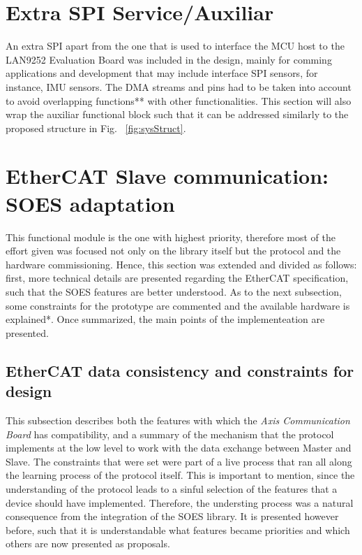 \section{Extra SPI Service/Auxiliar}\label{sec:spi}

An extra SPI apart from the one that is used to interface the MCU host to the LAN9252 Evaluation Board was included in the design, mainly for comming applications and development that may include interface SPI sensors, for instance, IMU sensors. The DMA streams and pins had to be taken into account to avoid overlapping functions** with other functionalities.
This section will also wrap the auxiliar functional block such that it can be addressed similarly to the proposed structure in Fig. ~\ref{fig:sysStruct}.

\section{EtherCAT Slave communication: SOES adaptation}\label{sec:soes}
This functional module is the one with highest priority, therefore most of the effort given was focused not only 
on the library itself but the protocol and the hardware commissioning. Hence, this section was extended and divided
as follows: first, more technical details are presented regarding the EtherCAT specification, such that the SOES
features are better understood. As to the next subsection, some constraints for the prototype are commented and the 
available hardware is explained*. Once summarized, the main points of the implementeation are presented.

\subsection{EtherCAT data consistency and constraints for design}\label{sec:ecat_sms}
This subsection describes both the features with which the \emph{Axis Communication Board} has compatibility, and a summary of the mechanism that the protocol
implements at the low level to work with the data exchange between Master and Slave. The constraints that were set were part of a live process that ran all along
the learning process of the protocol itself. This is important to mention, since the understanding of the protocol leads to a sinful selection of the features
that a device should have implemented. Therefore, the understing process was a natural consequence from the integration of the SOES library. It is presented however before, such that 
it is understandable what features became priorities and which others are now presented as proposals.

